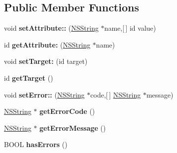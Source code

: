 \subsection*{\-Public \-Member \-Functions}
\begin{DoxyCompactItemize}
\item 
\hypertarget{interface_command_context_a0b8bd20fcb252ddf29e9d9dae283c74c}{
void {\bfseries set\-Attribute\-::} (\hyperlink{class_n_s_string}{\-N\-S\-String} $\ast$name,\mbox{[}$\,$\mbox{]} id value)}
\label{interface_command_context_a0b8bd20fcb252ddf29e9d9dae283c74c}

\item 
\hypertarget{interface_command_context_a3a47d7b68985f7fef98aad713daa5d6f}{
id {\bfseries get\-Attribute\-:} (\hyperlink{class_n_s_string}{\-N\-S\-String} $\ast$name)}
\label{interface_command_context_a3a47d7b68985f7fef98aad713daa5d6f}

\item 
\hypertarget{interface_command_context_a4843201ab3232a624cc001600d9dd551}{
void {\bfseries set\-Target\-:} (id target)}
\label{interface_command_context_a4843201ab3232a624cc001600d9dd551}

\item 
\hypertarget{interface_command_context_a0a098f39f68014cb11a72a838e5f6f81}{
id {\bfseries get\-Target} ()}
\label{interface_command_context_a0a098f39f68014cb11a72a838e5f6f81}

\item 
\hypertarget{interface_command_context_aa62fb99118c778cc08c7b72b27d77647}{
void {\bfseries set\-Error\-::} (\hyperlink{class_n_s_string}{\-N\-S\-String} $\ast$code,\mbox{[}$\,$\mbox{]} \hyperlink{class_n_s_string}{\-N\-S\-String} $\ast$message)}
\label{interface_command_context_aa62fb99118c778cc08c7b72b27d77647}

\item 
\hypertarget{interface_command_context_aa2a78fb1ffdb86f1037426f7e570ed76}{
\hyperlink{class_n_s_string}{\-N\-S\-String} $\ast$ {\bfseries get\-Error\-Code} ()}
\label{interface_command_context_aa2a78fb1ffdb86f1037426f7e570ed76}

\item 
\hypertarget{interface_command_context_aa553ae8eb3a85f7cfc5756866ced48a5}{
\hyperlink{class_n_s_string}{\-N\-S\-String} $\ast$ {\bfseries get\-Error\-Message} ()}
\label{interface_command_context_aa553ae8eb3a85f7cfc5756866ced48a5}

\item 
\hypertarget{interface_command_context_afb6922cbed9d44144ccfc5755b8add65}{
\-B\-O\-O\-L {\bfseries has\-Errors} ()}
\label{interface_command_context_afb6922cbed9d44144ccfc5755b8add65}


\end{DoxyCompactItemize}
